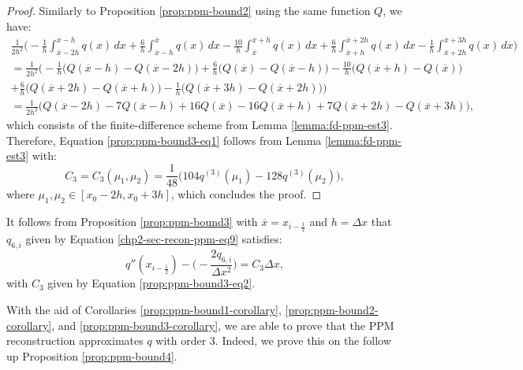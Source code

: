 \begin{proof}
	Similarly to Proposition \ref{prop:ppm-bound2} using the same function $Q$, we have:
	\begin{align*}
	\frac{1}{2h^2}
		\bigg(-\frac{1}{h} \int_{\overline{x}-2h}^{\overline{x}-h} q(x) \,dx 
		      +\frac{6}{h}\int_{\overline{x}-h}^{\overline{x}} q(x) \,dx   
		      -\frac{10}{h}\int_{\overline{x}}^{\overline{x}+h} q(x) \,dx  
		      +\frac{6}{h} \int_{\overline{x}+h}^{\overline{x}+2h} q(x) \,dx   
		      -\frac{1}{h} \int_{\overline{x}+2h}^{\overline{x}+3h} q(x) \,dx   
		\bigg)\\ 
		= \frac{1}{2h^2} \bigg(
		-\frac{1}{h}   \big( Q(\overline{x}-h)- Q(\overline{x}-2h)\big) 
		+\frac{6}{h} \big( Q(\overline{x}) - Q(\overline{x}-h) \big) 
		-\frac{10}{h} \big( Q(\overline{x}+h) - Q(\overline{x})  \big) \\
		+\frac{6}{h}  \big( Q(\overline{x}+2h) - Q(\overline{x}+h)  \big) 
		-\frac{1}{h}  \big( Q(\overline{x}+3h) - Q(\overline{x}+2h)  \big) 
		\bigg)\\
		= \frac{1}{2h^3}\bigg(Q(\overline{x}-2h) - 7Q(\overline{x}-h) + 16Q(\overline{x}) 
		-16Q(\overline{x}+h) +7Q(\overline{x}+2h) - Q(\overline{x}+3h)  \bigg),
	\end{align*}
	which consists of the finite-difference scheme from Lemma \ref{lemma:fd-ppm-est3}. 
	Therefore, Equation \eqref{prop:ppm-bound3-eq1} follows from 
	Lemma \ref{lemma:fd-ppm-est3} with:
	\begin{equation}
		\label{prop:ppm-bound3-eq2}
		C_3 = C_3(\mu_1,\mu_{2}) = \frac{1}{48}\bigg(104q^{(3)}(\mu_{1}) - 128q^{(3)}(\mu_{2}) \bigg), 
	\end{equation}
	where $\mu_{1}, \mu_{2} \in [x_0-2h,x_0+3h]$, which concludes the proof.
\end{proof}

\begin{corollary}
	\label{prop:ppm-bound3-corollary}
	It follows from Proposition \ref{prop:ppm-bound3} with 
	$\overline{x} = x_{i-\frac{1}{2}}$ and $h = \Delta x$
	that $q_{6,i}$ given by Equation \eqref{chp2-sec-recon-ppm-eq9} satisfies:
	\begin{equation}
		\label{ppm-edges-bound3}
	q''(x_{i-\frac{1}{2}}) -\bigg(-\frac{2q_{6, i}}{\Delta x^2}\bigg) = C_3\Delta x,
	\end{equation}
	with $C_3$ given by Equation \eqref{prop:ppm-bound3-eq2}.
\end{corollary}

With the aid of Corollaries \ref{prop:ppm-bound1-corollary}, \ref{prop:ppm-bound2-corollary},
and  \ref{prop:ppm-bound3-corollary}, we are able to prove
that the PPM reconstruction approximates $q$ with order 3.
Indeed, we prove this on the follow up Proposition \ref{prop:ppm-bound4}.

